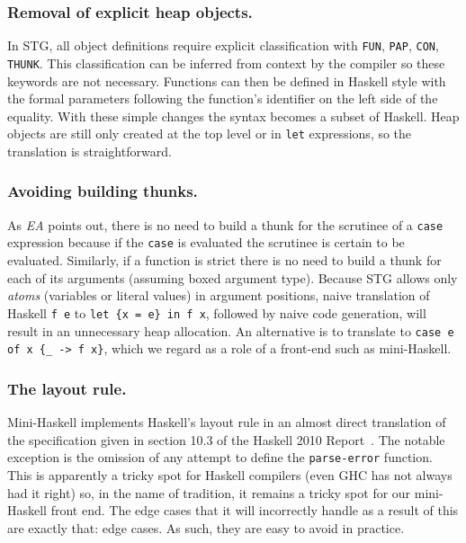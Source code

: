 \documentclass{llncs}
\begin{document}
\subsubsection{Removal of explicit heap objects.}
In STG, all object definitions require explicit classification with
\texttt{FUN}, \texttt{PAP}, \texttt{CON}, \texttt{THUNK}. This
classification can be inferred from context by the compiler so these
keywords are not necessary.  Functions can then be defined in Haskell
style with the formal parameters following the function's identifier
on the left side of the equality. With these simple changes the syntax
becomes a subset of Haskell. Heap objects are still only created at
the top level or in \texttt{let} expressions, so the translation is
straightforward.

\begin{comment} Trimming Mini-Haskell to fit page limit
\texttt{FUN} objects are
identifiable by the inclusion of these parameters.  A \texttt{PAP} object is
created when a known function is partially applied.  \texttt{CON} objects are
created when constructors are fully applied.  Every other object becomes a
\texttt{THUNK}.
\end{comment}

\subsubsection{Avoiding building thunks.}
As \emph{EA} points out, there is no need to build a thunk for the scrutinee
of a \texttt{case} expression because if the \texttt{case} is evaluated the
scrutinee is certain to be evaluated.  Similarly, if a function is strict
there is no need to build a thunk for each of its arguments (assuming boxed
argument type).  Because STG allows only \emph{atoms} (variables or literal
values) in argument positions, naive translation of Haskell \texttt{f e} to
\texttt{let \{x = e\} in f x}, followed by naive code generation, will result in
an unnecessary heap allocation.  An alternative is to translate to
\texttt{case e of x \{\_ -> f x\}}, which we regard as a role of a front-end
such as mini-Haskell.

\subsubsection{The layout rule.}
Mini-Haskell implements Haskell's layout rule in an almost direct translation
of the specification given in section 10.3 of the Haskell 2010
Report~\cite{haskell2010report}. The notable exception is the omission of any
attempt to define the \texttt{parse-error} function.  This is apparently a
tricky spot for Haskell compilers (even GHC has not always had it right) so,
in the name of tradition, it remains a tricky spot for our mini-Haskell front
end.  The edge cases that it will incorrectly handle as a result of this are
exactly that: edge cases.  As such, they are easy to avoid in practice.
\end{document}
